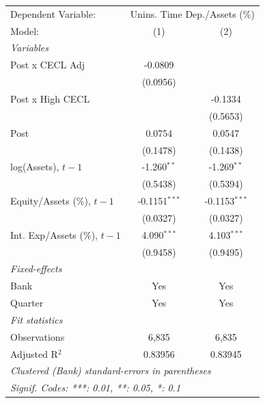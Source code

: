 
\begingroup
\centering
\begin{tabular}{lcc}
   \tabularnewline \midrule \midrule
   Dependent Variable: & \multicolumn{2}{c}{Unins. Time Dep./Assets (\%)}\\
   Model:                         & (1)             & (2)\\  
   \midrule
   \emph{Variables}\\
   Post x CECL Adj                & -0.0809         &   \\   
                                  & (0.0956)        &   \\   
   Post x High CECL               &                 & -0.1334\\   
                                  &                 & (0.5653)\\   
   Post                           & 0.0754          & 0.0547\\   
                                  & (0.1478)        & (0.1438)\\   
   log(Assets), $t{-}1$           & -1.260$^{**}$   & -1.269$^{**}$\\   
                                  & (0.5438)        & (0.5394)\\   
   Equity/Assets (\%), $t{-}1$    & -0.1151$^{***}$ & -0.1153$^{***}$\\   
                                  & (0.0327)        & (0.0327)\\   
   Int. Exp/Assets (\%), $t{-}1$  & 4.090$^{***}$   & 4.103$^{***}$\\   
                                  & (0.9458)        & (0.9495)\\   
   \midrule
   \emph{Fixed-effects}\\
   Bank                           & Yes             & Yes\\  
   Quarter                        & Yes             & Yes\\  
   \midrule
   \emph{Fit statistics}\\
   Observations                   & 6,835           & 6,835\\  
   Adjusted R$^2$                 & 0.83956         & 0.83945\\  
   \midrule \midrule
   \multicolumn{3}{l}{\emph{Clustered (Bank) standard-errors in parentheses}}\\
   \multicolumn{3}{l}{\emph{Signif. Codes: ***: 0.01, **: 0.05, *: 0.1}}\\
\end{tabular}
\par\endgroup


